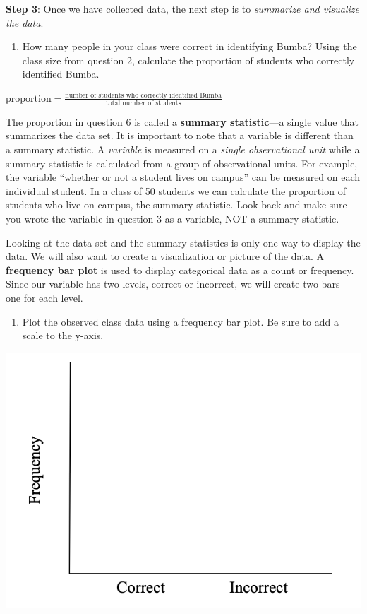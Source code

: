 \documentclass[
]{report}
\providecommand{\tightlist}{%
  \setlength{\itemsep}{0pt}\setlength{\parskip}{0pt}}
\begin{document}
\textbf{Step 3}: Once we have collected data, the next step is to \emph{summarize and visualize the data}.

\begin{enumerate}
\def\labelenumi{\arabic{enumi}.}
\setcounter{enumi}{5}
\tightlist
\item
  How many people in your class were correct in identifying Bumba? Using the class size from question 2, calculate the proportion of students who correctly identified Bumba.
\end{enumerate}

\begin{center}
$\mbox{proportion} = \frac{\mbox{number of students who correctly identified Bumba}}{\mbox{total number of students}}$
\end{center}

\vspace{0.7in}

The proportion in question 6 is called a \textbf{summary statistic}---a single value that summarizes the data set. It is important to note that a variable is different than a summary statistic. A \emph{variable} is measured on a \emph{single observational unit} while a summary statistic is calculated from a group of observational units. For example, the variable ``whether or not a student lives on campus'' can be measured on each individual student. In a class of 50 students we can calculate the proportion of students who live on campus, the summary statistic. Look back and make sure you wrote the variable in question 3 as a variable, NOT a summary statistic.

Looking at the data set and the summary statistics is only one way to display the data. We will also want to create a visualization or picture of the data. A \textbf{frequency bar plot} is used to display categorical data as a count or frequency. Since our variable has two levels, correct or incorrect, we will create two bars---one for each level.

\begin{enumerate}
\def\labelenumi{\arabic{enumi}.}
\setcounter{enumi}{6}
\tightlist
\item
  Plot the observed class data using a frequency bar plot. Be sure to add a scale to the y-axis.
\end{enumerate}

\begin{center}\includegraphics[width=0.4\linewidth]{images/barplot_martian} \end{center}
\end{document}
